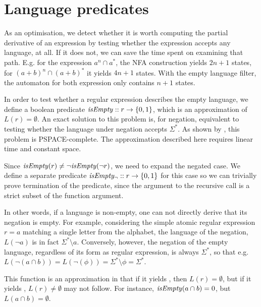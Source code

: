 \section{Language predicates}

As an optimisation, we detect whether it is worth computing the partial
derivative of an expression by testing whether the expression accepts any
language, at all. If it does not, we can save the time spent on examining that
path. E.g. for the expression $a^n \cap a^*$, the NFA construction yields $2n +
1$ states, for $(a+b)^n \cap (a+b)^*$ it yields $4n + 1$ states. With the empty
language filter, the automaton for both expression only contains $n + 1$ states.

In order to test whether a regular expression describes the empty language, we
define a boolean predicate $\mathit{isEmpty} :: r \to \{0, 1\}$, which is an
approximation of $L(r) = \emptyset$. An exact solution to this problem is, for
negation, equivalent to testing whether the language under negation accepts
$\Sigma^*$. As shown by \cite{stoc73}, this problem is PSPACE-complete. The
approximation described here requires linear time and constant space.

Since $\mathit{isEmpty}(r) \neq \neg\mathit{isEmpty}(\neg r)$, we need to expand the negated
case. We define a separate predicate $\mathit{isEmpty_\neg} :: r \to \{0, 1\}$ for this
case so we can trivially prove termination of the predicate, since the argument
to the recursive call is a strict subset of the function argument.

In other words, if a language is non-empty, one can not directly derive that its
negation is empty. For example, considering the simple atomic regular expression
$r = a$ matching a single letter from the alphabet, the language of the
negation, $L(\neg a)$ is in fact $\Sigma^* \setminus a$. Conversely, however,
the negation of the empty language, regardless of its form as regular
expression, is always $\Sigma^*$, so that e.g. $L(\neg(a \cap b)) =
L(\neg(\phi)) = \Sigma^* \setminus \phi = \Sigma^*$.

This function is an approximation in that if it yields \true, then $L(r) =
\emptyset$, but if it yields \false, $L(r) \neq \emptyset$ may not follow. For
instance, $\mathit{isEmpty}(a \cap b) = 0$, but $L(a \cap b) = \emptyset$.

